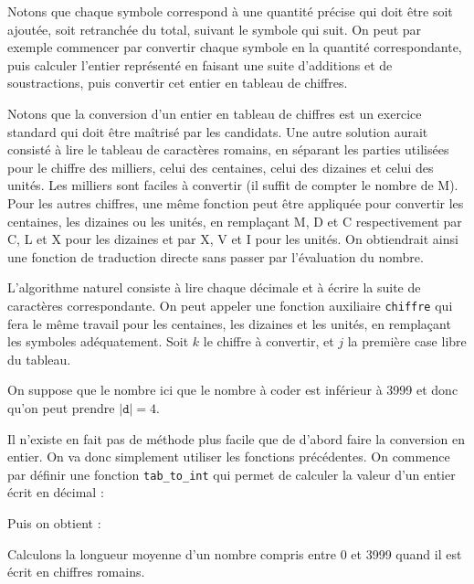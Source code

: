 \Q
Notons que chaque symbole correspond à une quantité précise qui doit être soit ajoutée, soit retranchée du total, suivant le symbole qui suit. On peut par exemple commencer par convertir chaque symbole en la quantité correspondante, puis calculer l'entier représenté en faisant une suite d'additions et de soustractions, puis convertir cet entier en tableau de chiffres.



Notons que la conversion d'un entier en tableau de chiffres est un exercice standard qui doit être maîtrisé par les candidats. Une autre solution aurait consisté à lire le tableau de caractères romains, en séparant les parties utilisées pour le chiffre des milliers, celui des centaines, celui des dizaines et celui des unités. Les milliers sont faciles à convertir (il suffit de compter le nombre de M). Pour les autres chiffres, une même fonction peut être appliquée pour convertir les centaines, les dizaines ou les unités, en remplaçant M, D et C respectivement par C, L et X pour les dizaines et par X, V et I pour les unités. On obtiendrait ainsi une fonction de traduction directe sans passer par l'évaluation du nombre.

\Q
L'algorithme naturel consiste à lire chaque décimale et à écrire la suite de caractères correspondante. On peut appeler une fonction auxiliaire \texttt{chiffre} qui fera le même travail pour les centaines, les dizaines et les unités, en remplaçant les symboles adéquatement. Soit $k$ le chiffre à convertir, et $j$ la première case libre du tableau.
\medskip

On suppose que le nombre ici que le nombre à coder est inférieur à 3999 et donc qu'on peut prendre $|\texttt{d}| = 4$.



\Q
Il n'existe en fait pas de méthode plus facile que de d'abord faire la conversion en entier. On va donc simplement utiliser les fonctions précédentes. On commence par définir une fonction \texttt{tab\_to\_int} qui permet de calculer la valeur d'un entier écrit en décimal :



Puis on obtient :



\Q
Calculons la longueur moyenne d'un nombre compris entre 0 et 3999 quand il est écrit en chiffres romains.
\medskip

